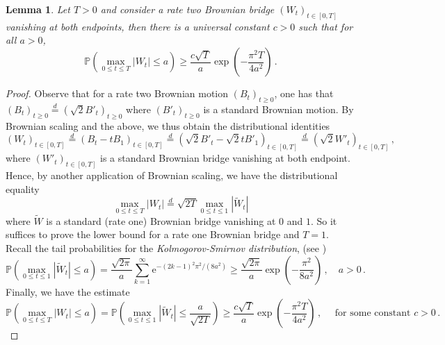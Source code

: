 \documentclass[11pt, reqno]{amsart}
\numberwithin{equation}{section}
\newcounter{dummy} \numberwithin{dummy}{section}
\newtheorem{lemma}[dummy]{Lemma}
\newcommand{\PP}{\ensuremath{\mathbb{P}}}
\begin{document}
\begin{lemma}\label{lemma: brownian bridge maximum}
    Let $T>0$ and consider a rate two Brownian bridge $(W_t)_{t\in [0,T]}$ vanishing at both endpoints, then there is a universal constant $c>0$ such that for all $a>0$, 
    \begin{equation*}
    \PP\left(\displaystyle\max_{0\le t\le T}|W_t|\le a\right) \ge \frac{c\sqrt{T}}{a} \exp \left( - \frac{\pi^2 T}{4a^2}\right)\,.
    \end{equation*}
\end{lemma}
\begin{proof}
Observe that for a rate two Brownian motion $(B_t)_{t\ge 0}$, one has that $(B_t)_{t\ge 0} \stackrel{d}{=} (\sqrt{2}B'_{t})_{t\ge 0}$ where $(B'_{t})_{t\ge 0}$ is a standard Brownian motion. By Brownian scaling and the above, we thus obtain the distributional identities 
    \begin{equation*}
    (W_t)_{t\in [0,T]} \stackrel{d}{=} (B_t-tB_1)_{t\in [0,T]} \stackrel{d}{=} (\sqrt{2}B'_{t}-\sqrt{2}tB'_{1})_{t\in [0,T]}\stackrel{d}{=} (\sqrt{2}W'_t)_{t\in [0,T]}\,,
    \end{equation*}
    where $ (W'_t)_{t\in [0,T]}$ is a standard Brownian bridge vanishing at both endpoint. Hence, by another application of Brownian scaling, we have the distributional equality
    \begin{equation*}
    \displaystyle\max_{0\le t\le T}|W_t| \stackrel{d}{=} \sqrt{2T}\displaystyle\max_{0\le t\le 1}|\tilde{W}_t| 
    \end{equation*}
 where $\tilde{W}$ is a standard (rate one) Brownian bridge vanishing at $0$ and $1$. So it suffices to prove the lower bound for a rate one Brownian bridge and $T=1$. Recall the tail probabilities for the \emph{Kolmogorov-Smirnov distribution}, (see \cite{berger2014kolmogorov})
 \[
 \PP\left(\displaystyle\max_{0\le t\le 1}|\tilde{W}_t|\le a \right) = \frac{\sqrt{2\pi}}{a}\displaystyle\sum_{k=1}^\infty \mathrm{e}^{-(2k-1)^2\pi^2/(8a^2)}\ge \frac{\sqrt{2\pi}}{a}\exp \left( -\frac{\pi^2}{8a^2}\right)\,,\quad a > 0\,.
 \]
Finally, we have the estimate
\begin{equation*}
\PP\left(\displaystyle\max_{0\le t\le T}|W_t|\le a\right)  = \PP\left(\displaystyle\max_{0\le t\le 1}|\tilde{W}_t|\le \frac{a}{\sqrt{2T}}\right) \ge \frac{c\sqrt{T}}{a} \exp \left( - \frac{\pi^2 T}{4a^2}\right)\,,\quad \mbox{ for some constant }c>0\,.
\end{equation*}
\end{proof}
\end{document}
